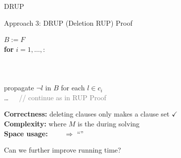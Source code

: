 \documentclass[t,english]{sdqbeamer}
\begin{document}
\begin{frame}{DRUP}
	\begin{blueblock}{Approach 3: DRUP (Deletion RUP) Proof}
		\vspace*{2mm}\hspace*{0.5cm}\begin{minipage}{12cm}
			$B := F$\\
			\textbf{for} $i=1,\ldots,$:\\
			\hspace*{1cm}  \\
			\hspace*{2cm}  \\
			\hspace*{2cm}  \\
			\hspace*{1cm} propagate $\neg l$ in $B$ for each $l \in c_i$ \\
			\hspace*{1cm} \ldots\ \ \ \textcolor{gray}{// continue as in RUP Proof}
		\end{minipage}
	\end{blueblock}
	
	\vspace*{2mm}
	\textbf{Correctness:} \pause deleting clauses only makes a clause set  $\checkmark$\\
	\textbf{Complexity:} \pause {} where $M$ is the  during solving \\
	\textbf{Space usage:} \pause {} \ \ \ \ $\Rightarrow$ ``''
	
	\vspace*{2mm}
	Can we further improve running time?
\end{frame}
\end{document}
